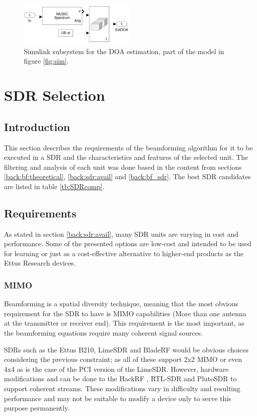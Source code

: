 \documentclass[12pt,a4paper]{report}
\begin{document}
\begin{figure}[!h]
    \centering
    \includegraphics[width = 0.5\textwidth]{Figures/SL_doa.png}
    \caption[Simulink subsystem for the DOA estimation.]{Simulink subsystem for the DOA estimation, part of the model in figure \ref{fig:sim}.}
    \label{fig:sl:doa}
\end{figure}

\newpage
\section{SDR Selection} \label{met:sdr}
\subsection{Introduction} \label{met:sdr:intro}
This section describes the requirements of the beamforming algorithm for it to be executed in a SDR and the characteristics and features of the selected unit. The filtering and analysis of each unit was done based in the content from sections \ref{back:bf:theoretical}, \ref{back:sdr:avail} and \ref{back:bf_sdr}. The best SDR candidates are listed in table \ref{tb:SDRcomp}.

\subsection{Requirements} \label{met:sdr:req}
As stated in section \ref{back:sdr:avail}, many SDR units are varying in cost and performance. Some of the presented options are low-cost and intended to be used for learning or just as a cost-effective alternative to higher-end products as the Ettus Research devices. 

\subsubsection{MIMO} \label{met:sdr:req:mimo}
Beamforming is a spatial diversity technique, meaning that the most obvious requirement for the SDR to have is MIMO capabilities (More than one antenna at the transmitter or receiver end). This requirement is the most important, as the beamforming equations require many coherent signal sources.

SDRs such as the Ettus B210, LimeSDR and BladeRF would be obvious choices considering the previous constraint; as all of these support 2x2 MIMO or even 4x4 as is the case of the PCI version of the LimeSDR. However, hardware modifications and can be done to the HackRF \cite{Edgcombe2019MultipleSynchronization}, RTL-SDR \cite{Laakso2018Phase-coherentBeamforming, Myrick2018DistributedRadios, Othernet2019KerberosSDR} and PlutoSDR \cite{CoherentReceiver2020CoherentSDR} to support coherent streams. These modifications vary in difficulty and resulting performance and may not be suitable to modify a device only to serve this purpose permanently.
\end{document}
